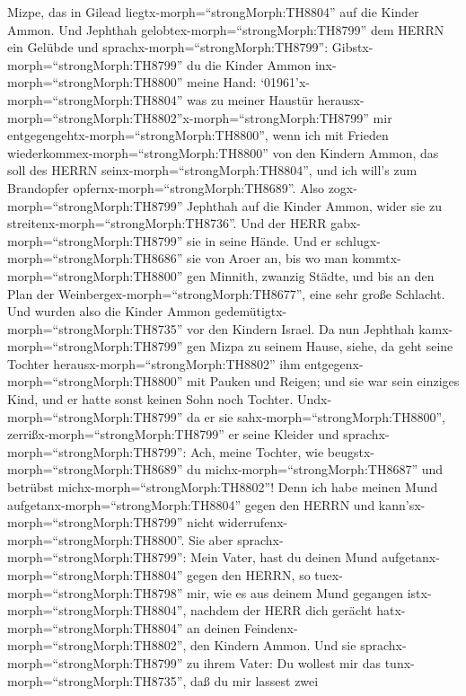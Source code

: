 Mizpe, das in Gilead liegtx-morph=``strongMorph:TH8804'' auf die Kinder
Ammon.  Und Jephthah gelobtex-morph=``strongMorph:TH8799''
dem HERRN ein Gelübde und sprachx-morph=``strongMorph:TH8799'':
Gibstx-morph=``strongMorph:TH8799'' du die Kinder Ammon
inx-morph=``strongMorph:TH8800'' meine Hand: 
`01961'\textbar x-morph=``strongMorph:TH8804'' was zu meiner Haustür
herausx-morph=``strongMorph:TH8802''x-morph=``strongMorph:TH8799'' mir
entgegengehtx-morph=``strongMorph:TH8800'', wenn ich mit Frieden
wiederkommex-morph=``strongMorph:TH8800'' von den Kindern Ammon, das
soll des HERRN seinx-morph=``strongMorph:TH8804'', und ich will's zum
Brandopfer opfernx-morph=``strongMorph:TH8689''.  Also
zogx-morph=``strongMorph:TH8799'' Jephthah auf die Kinder Ammon, wider
sie zu streitenx-morph=``strongMorph:TH8736''. Und der HERR
gabx-morph=``strongMorph:TH8799'' sie in seine Hände.  Und
er schlugx-morph=``strongMorph:TH8686'' sie von Aroer an, bis wo man
kommtx-morph=``strongMorph:TH8800'' gen Minnith, zwanzig Städte, und bis
an den Plan der Weinbergex-morph=``strongMorph:TH8677'', eine sehr große
Schlacht. Und wurden also die Kinder Ammon
gedemütigtx-morph=``strongMorph:TH8735'' vor den Kindern Israel.
 Da nun Jephthah kamx-morph=``strongMorph:TH8799'' gen
Mizpa zu seinem Hause, siehe, da geht seine Tochter
herausx-morph=``strongMorph:TH8802'' ihm
entgegenx-morph=``strongMorph:TH8800'' mit Pauken und Reigen; und sie
war sein einziges Kind, und er hatte sonst keinen Sohn noch Tochter.
 Undx-morph=``strongMorph:TH8799'' da er sie
sahx-morph=``strongMorph:TH8800'', zerrißx-morph=``strongMorph:TH8799''
er seine Kleider und sprachx-morph=``strongMorph:TH8799'': Ach, meine
Tochter, wie beugstx-morph=``strongMorph:TH8689'' du
michx-morph=``strongMorph:TH8687'' und betrübst
michx-morph=``strongMorph:TH8802''! Denn ich habe meinen Mund
aufgetanx-morph=``strongMorph:TH8804'' gegen den HERRN und
kann'sx-morph=``strongMorph:TH8799'' nicht
widerrufenx-morph=``strongMorph:TH8800''.  Sie aber
sprachx-morph=``strongMorph:TH8799'': Mein Vater, hast du deinen Mund
aufgetanx-morph=``strongMorph:TH8804'' gegen den HERRN, so
tuex-morph=``strongMorph:TH8798'' mir, wie es aus deinem Mund gegangen
istx-morph=``strongMorph:TH8804'', nachdem der HERR dich gerächt
hatx-morph=``strongMorph:TH8804'' an deinen
Feindenx-morph=``strongMorph:TH8802'', den Kindern Ammon. 
Und sie sprachx-morph=``strongMorph:TH8799'' zu ihrem Vater: Du wollest
mir das tunx-morph=``strongMorph:TH8735'', daß du mir lassest zwei
